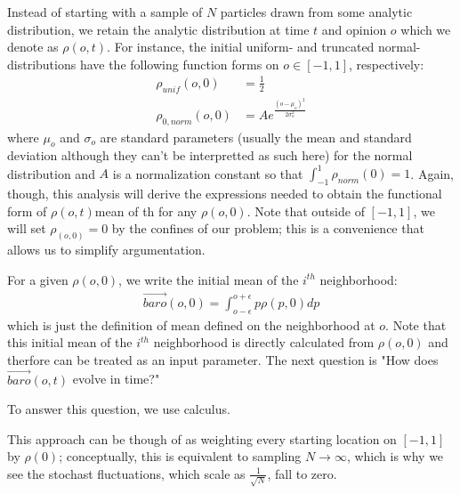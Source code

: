 \documentclass{article}
\begin{document}
Instead of starting with a sample of $N$ particles drawn from some analytic distribution,
we retain the analytic distribution at time $t$ and opinion $o$
which we denote as $\rho(o, t)$.  For instance, the initial uniform- and truncated
normal- distributions
have the following function forms on $o \in [-1, 1]$, respectively:
\begin{subequations}
    \begin{align}
        \rho_{unif}(o, 0) &= \frac{1}{2}\\
        \rho_{0, norm}(o, 0) &= A e^{\frac{(o-\mu_o)^2}{2 \sigma_o^2}}
    \end{align}
\end{subequations}
where $\mu_o$ and $\sigma_o$ are standard parameters (usually the 
mean and standard deviation although
they can't be interpretted as such here) for the normal distribution
and $A$ is a normalization constant so that $\int_{-1}^1 \rho_{norm}(0) = 1$.  Again, though,
this analysis will derive the expressions needed to obtain the functional form of $\rho(o, t)$mean of th
for any $\rho(o, 0)$.
Note that outside of $[-1, 1]$, we will set $\rho_(o,0) = 0$ by the confines of our problem; this is a convenience
that allows us to simplify argumentation.

For a given $\rho(o, 0)$, we write the initial mean of the $i^{th}$ neighborhood:
\begin{align}
    {\vec{bar{o}}}(o, 0) = \int_{o - \epsilon}^{o + \epsilon} p \rho(p, 0) dp
\end{align}
which is just the definition of mean defined on the neighborhood at $o$. 
Note that this initial mean of the $i^{th}$ neighborhood
is directly calculated from $\rho(o, 0)$ and therfore can be treated as an input parameter.
The next question is "How does ${\vec{bar{o}}}(o, t)$ evolve in time?"

To answer this question, we use calculus.

This approach can be though of as weighting
every starting location on $[-1, 1]$ by $\rho(0)$; conceptually, this is equivalent to
sampling $N \to \infty$, which is why we see the stochast fluctuations, which scale as $\frac{1}{\sqrt{N}}$, fall
to zero. 
\end{document}
